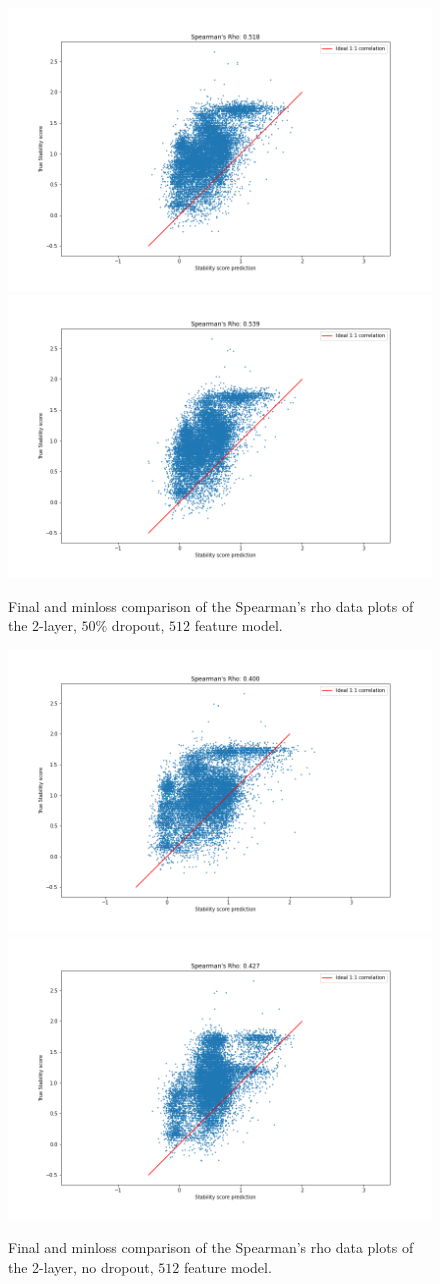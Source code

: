 \begin{figure}[!ht]
  \centering
  \includegraphics[width=0.49\linewidth]{latex/imgs/spearman_2_layer_05_drop_final.png}
  \includegraphics[width=0.49\linewidth]{latex/imgs/spearman_2_layer_05_drop_minloss.png}
  \caption{Final and minloss comparison of the Spearman's rho data plots of the 2-layer, $50\%$ dropout, $512$ feature model.}
\end{figure}
\begin{figure}[!ht]
  \includegraphics[width=0.49\linewidth]{latex/imgs/spearman_2_layer_no_drop_final.png}
  \includegraphics[width=0.49\linewidth]{latex/imgs/spearman_2_layer_no_drop_minloss.png}
  \caption{Final and minloss comparison of the Spearman's rho data plots of the 2-layer, no dropout, $512$ feature model.}
\end{figure}
